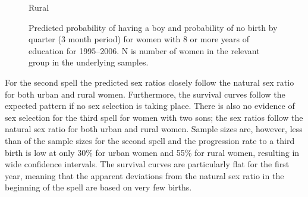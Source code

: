 \documentclass[12pt,letterpaper]{article}
\begin{document}
\begin{figure}[htpb]
{}
\caption*{Rural}
\setcounter{subfigure}{1}
\setcounter{subfigure}{2}
\setcounter{subfigure}{3}
\caption{Predicted probability of having a boy and probability of
no birth by quarter (3 month period) for women with 8 or more years
of education for 1995--2006. 
N is number of women in the relevant group in the underlying samples.
}
\label{fig:boys_latest}
\end{figure}


For the second spell the predicted sex ratios closely follow the natural sex 
ratio for both urban and rural women.
Furthermore, the survival curves follow the expected pattern if no sex selection 
is taking place.
There is also no evidence of sex selection for the third spell for women with two sons;
the sex ratios follow the natural sex ratio for both urban and rural women.
Sample sizes are, however, less than  of the sample sizes for the second 
spell and the progression rate to a third birth is low at only 30\% for urban women and 
55\% for rural women, resulting in wide confidence intervals.
The survival curves are particularly flat for the first year, meaning that the apparent 
deviations from the natural sex ratio in the beginning of the spell are based on very few births.
\end{document}
